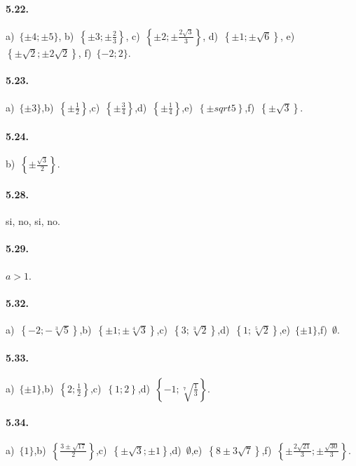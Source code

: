 \paragraph{5.22.} a)~$\{\pm 4;\pm 5\}$,\; b)~$\left\{\pm 3;\pm \frac 2 3\right\}$,\; c)~$\left\{\pm 2;\pm \frac{2\sqrt 3} 3\right\}$,\; d)~$\left\{\pm 1;\pm \sqrt 6\right\}$,\; e)~$\left\{\pm \sqrt 2;\pm 2\sqrt 2\right\}$,\; f)~$\{-2;2\}$.

\paragraph{5.23.} a)~$\{\pm 3\}$,\quad b)~$\left\{\pm \frac 1 2\right\}$,\quad c)~$\left\{\pm \frac 3 4\right\}$,\quad d)~$\left\{\pm \frac 1 4\right\}$,\quad e)~$\left\{\pm sqrt 5\right\}$,\quad f)~$\left\{\pm \sqrt 3\right\}$.

\paragraph{5.24.} b)~$\left\{\pm \frac{\sqrt 3} 2\right\}$.

\paragraph{5.28.} si, no, si, no.

\paragraph{5.29.} $a>1$.

\paragraph{5.32.} a)~$\left\{-2;-\sqrt[3]5\right\}$,\quad b)~$\left\{\pm 1;\pm \sqrt[4]3\right\}$,\quad c)~$\left\{3;\sqrt[3]2\right\}$,\quad d)~$\left\{1;\sqrt[5]2\right\}$,\quad e)~$\{\pm 1\}$,\quad f)~$\emptyset $.

\paragraph{5.33.} a)~$\{\pm 1\}$,\quad b)~$\left\{2;\frac 1 2\right\}$,\quad c)~$\left\{1;2\right\}$,\quad d)~$\left\{-1;\sqrt[7]{\frac 1 3}\right\}$.

\paragraph{5.34.} a)~$\{1\}$,\quad b)~$\left\{\frac{3\pm\sqrt{17}} 2\right\}$,\quad c)~$\left\{\pm\sqrt 3;\pm 1\right\}$,\quad d)~$\emptyset $,\quad e)~$\left\{8\pm3\sqrt 7\right\}$,\quad f)~$\left\{\pm \frac{2\sqrt{21}} 3;\pm \frac{\sqrt{30}} 3\right\}$.

